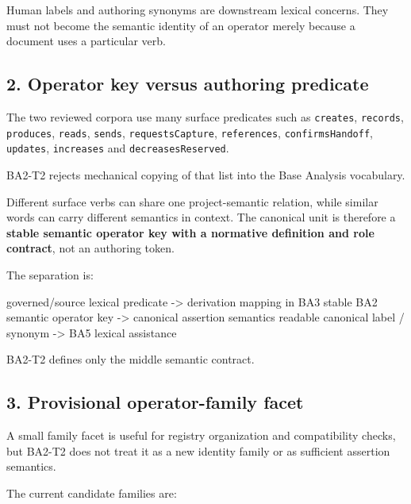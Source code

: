 \documentclass[
  10pt,
  letterpaper,
]{article}
\newenvironment{Shaded}{}{}
\newcommand{\NormalTok}[1]{#1}
\begin{document}
Human labels and authoring synonyms are downstream lexical concerns.
They must not become the semantic identity of an operator merely because
a document uses a particular verb.

\subsection{2. Operator key versus authoring
predicate}\label{operator-key-versus-authoring-predicate}

The two reviewed corpora use many surface predicates such as
\texttt{creates}, \texttt{records}, \texttt{produces}, \texttt{reads},
\texttt{sends}, \texttt{requestsCapture}, \texttt{references},
\texttt{confirmsHandoff}, \texttt{updates}, \texttt{increases} and
\texttt{decreasesReserved}.

BA2-T2 rejects mechanical copying of that list into the Base Analysis
vocabulary.

Different surface verbs can share one project-semantic relation, while
similar words can carry different semantics in context. The canonical
unit is therefore a \textbf{stable semantic operator key with a
normative definition and role contract}, not an authoring token.

The separation is:

\begin{Shaded}
\begin{Highlighting}[]
\NormalTok{governed/source lexical predicate}
\NormalTok{        {-}\textgreater{} derivation mapping in BA3}
\NormalTok{stable BA2 semantic operator key}
\NormalTok{        {-}\textgreater{} canonical assertion semantics}
\NormalTok{readable canonical label / synonym}
\NormalTok{        {-}\textgreater{} BA5 lexical assistance}
\end{Highlighting}
\end{Shaded}

BA2-T2 defines only the middle semantic contract.

\subsection{3. Provisional operator-family
facet}\label{provisional-operator-family-facet}

A small family facet is useful for registry organization and
compatibility checks, but BA2-T2 does not treat it as a new identity
family or as sufficient assertion semantics.

The current candidate families are:
\end{document}
